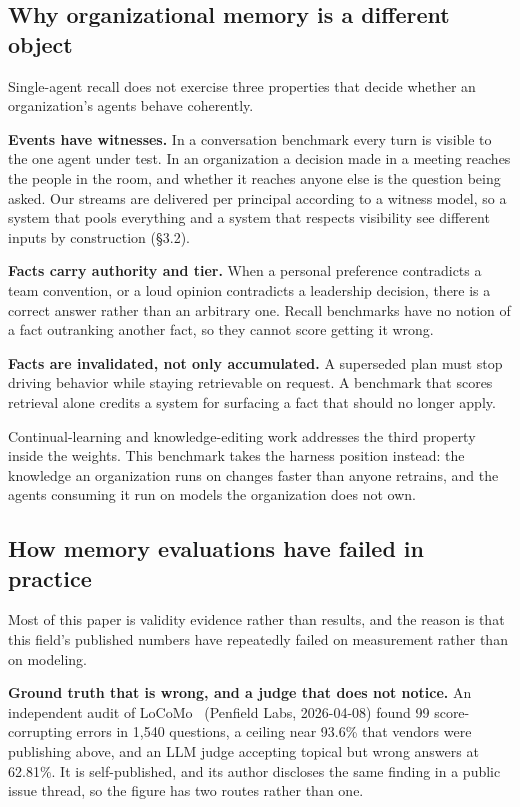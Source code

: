 \documentclass[11pt]{article}
\begin{document}
\subsection{Why organizational memory is a different object}

Single-agent recall does not exercise three properties that decide whether an
organization's agents behave coherently.

\textbf{Events have witnesses.} In a conversation benchmark every turn is visible
to the one agent under test. In an organization a decision made in a meeting
reaches the people in the room, and whether it reaches anyone else is the
question being asked. Our streams are delivered per principal according to a
witness model, so a system that pools everything and a system that respects
visibility see different inputs by construction (\S3.2).

\textbf{Facts carry authority and tier.} When a personal preference contradicts a
team convention, or a loud opinion contradicts a leadership decision, there is a
correct answer rather than an arbitrary one. Recall benchmarks have no notion of
a fact outranking another fact, so they cannot score getting it wrong.

\textbf{Facts are invalidated, not only accumulated.} A superseded plan must stop
driving behavior while staying retrievable on request. A benchmark that scores
retrieval alone credits a system for surfacing a fact that should no longer
apply.

Continual-learning and knowledge-editing work addresses the third property inside
the weights. This benchmark takes the harness position instead: the knowledge an
organization runs on changes faster than anyone retrains, and the agents
consuming it run on models the organization does not own.

\subsection{How memory evaluations have failed in practice}

Most of this paper is validity evidence rather than results, and the reason is
that this field's published numbers have repeatedly failed on measurement rather
than on modeling.

\textbf{Ground truth that is wrong, and a judge that does not notice.} An
independent audit of LoCoMo~\cite{locomo} (Penfield Labs, 2026-04-08) found 99
score-corrupting errors in 1{,}540 questions, a ceiling near 93.6\% that vendors
were publishing above, and an LLM judge accepting topical but wrong answers at
62.81\%. It is self-published, and its author discloses the same finding in a
public issue thread, so the figure has two routes rather than one.
\end{document}
